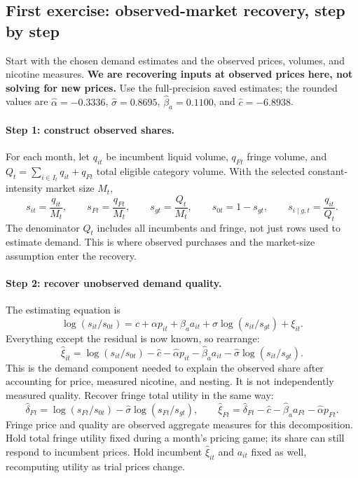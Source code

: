 \documentclass[11pt]{article}
\begin{document}
\subsection*{First exercise: observed-market recovery, step by step}

Start with the chosen demand estimates and the observed prices, volumes, and nicotine measures. \textbf{We are recovering inputs at observed prices here, not solving for new prices.} Use the full-precision saved estimates; the rounded values are $\widehat\alpha=-0.3336$, $\widehat\sigma=0.8695$, $\widehat\beta_a=0.1100$, and $\widehat c=-6.8938$.

\paragraph{Step 1: construct observed shares.}
For each month, let $q_{it}$ be incumbent liquid volume, $q_{Ft}$ fringe volume, and $Q_t=\sum_{i\in I_t}q_{it}+q_{Ft}$ total eligible category volume. With the selected constant-intensity market size $M_t$,
\[
s_{it}=\frac{q_{it}}{M_t},\qquad s_{Ft}=\frac{q_{Ft}}{M_t},\qquad
s_{gt}=\frac{Q_t}{M_t},\qquad s_{0t}=1-s_{gt},\qquad
s_{i\mid g,t}=\frac{q_{it}}{Q_t}.
\]
The denominator $Q_t$ includes all incumbents and fringe, not just rows used to estimate demand. This is where observed purchases and the market-size assumption enter the recovery.

\paragraph{Step 2: recover unobserved demand quality.}
The estimating equation is
\[
\log(s_{it}/s_{0t})=c+\alpha p_{it}+\beta_a a_{it}
+\sigma\log(s_{it}/s_{gt})+\xi_{it}.
\]
Everything except the residual is now known, so rearrange:
\[
\widehat\xi_{it}=\log(s_{it}/s_{0t})-\widehat c-\widehat\alpha p_{it}
-\widehat\beta_a a_{it}-\widehat\sigma\log(s_{it}/s_{gt}).
\]
This is the demand component needed to explain the observed share after accounting for price, measured nicotine, and nesting. It is not independently measured quality. Recover fringe total utility in the same way:
\[
\widehat\delta_{Ft}=\log(s_{Ft}/s_{0t})-\widehat\sigma\log(s_{Ft}/s_{gt}),\qquad
\widehat\xi_{Ft}=\widehat\delta_{Ft}-\widehat c-\widehat\beta_a a_{Ft}-\widehat\alpha p_{Ft}.
\]
Fringe price and quality are observed aggregate measures for this decomposition. Hold total fringe utility fixed during a month's pricing game; its share can still respond to incumbent prices. Hold incumbent $\widehat\xi_{it}$ and $a_{it}$ fixed as well, recomputing utility as trial prices change.
\end{document}
